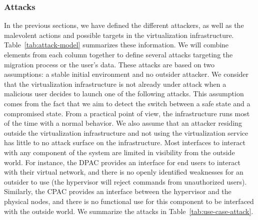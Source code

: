 \subsubsection{Attacks}
\label{sec:model-attacks}
In the previous sections, we have defined the different attackers, as well as the malevolent actions and possible targets in the virtualization infrastructure. 
Table~\ref{tab:attack-model} summarizes these information.
We will combine elements from each column together to define several attacks targeting the migration process or the user's data.
These attacks are based on two assumptions: a stable initial environment and no outsider attacker.
We consider that the virtualization infrastructure is not already under attack when a malicious user decides to launch one of the following attacks.
This assumption comes from the fact that we aim to detect the switch between a safe state and a compromised state. From a practical point of view, the infrastructure runs most of the time with a normal behavior.
We also assume that an attacker residing outside the virtualization infrastructure and not using the virtualization service has little to no attack surface on the infrastructure.
Most interfaces to interact with any component of the system are limited in visibility from the outside world.
For instance, the DPAC provides an interface for end users to interact with their virtual network, and there is no openly identified weaknesses for an outsider to use (\ie the hypervisor will reject commands from unauthorized users).
Similarly, the CPAC provides an interface between the hypervisor and the physical nodes, and there is no functional use for this component to be interfaced with the outside world.
We summarize the attacks in Table~\ref{tab:use-case-attack}.

